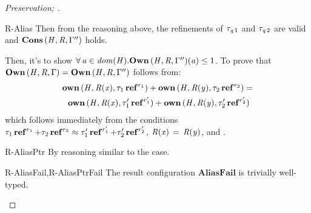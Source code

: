 \begin{proof}[Preservation; ]
\begin{rneqncase}{R-Alias}
    Then from the reasoning above, the refinements of $\tau_{\mathit{q}\,{\mathrm{1}}}$ and $\tau_{\mathit{q}\,{\mathrm{2}}}$ are valid and $\mathbf{Cons} \, (  \mathit{H}  ,  \mathit{R}  ,  \Gamma''  )$ holds.

    Then, it's to show $\forall \,  \mathit{a}  \in \mathit{dom}( \mathit{H} )   .  \mathbf{Own} \, (  \mathit{H}  ,  \mathit{R}  ,  \Gamma''  )  (  \mathit{a}  )  \le  1$.
    To prove that $\mathbf{Own} \, (  \mathit{H}  ,  \mathit{R}  ,  \Gamma  )  =  \mathbf{Own} \, (  \mathit{H}  ,  \mathit{R}  ,  \Gamma''  )$ follows from:
    \begin{align*}
      &\mathbf{own} \, (  \mathit{H}  ,  \mathit{R}  (  \mathit{x}  )  ,   \tau_{{\mathrm{1}}}  \operatorname{\mathbf{ref}}^{ r_{{\mathrm{1}}} }   )  +  \mathbf{own} \, (  \mathit{H}  ,  \mathit{R}  (  \mathit{y}  )  ,   \tau_{{\mathrm{2}}}  \operatorname{\mathbf{ref}}^{ r_{{\mathrm{2}}} }   ) =  \\
      &\,\,\,\,\mathbf{own} \, (  \mathit{H}  ,  \mathit{R}  (  \mathit{x}  )  ,   \tau'_{{\mathrm{1}}}  \operatorname{\mathbf{ref}}^{ r'_{{\mathrm{1}}} }   )  +  \mathbf{own} \, (  \mathit{H}  ,  \mathit{R}  (  \mathit{y}  )  ,   \tau'_{{\mathrm{2}}}  \operatorname{\mathbf{ref}}^{ r'_{{\mathrm{2}}} }   )
    \end{align*}
    which follows immediately from the conditions $  \tau_{{\mathrm{1}}}  \operatorname{\mathbf{ref}}^{ r_{{\mathrm{1}}} }   +  \tau_{{\mathrm{2}}}  \operatorname{\mathbf{ref}}^{ r_{{\mathrm{2}}} }   \approx    \tau'_{{\mathrm{1}}}  \operatorname{\mathbf{ref}}^{ r'_{{\mathrm{1}}} }   +  \tau'_{{\mathrm{2}}}  \operatorname{\mathbf{ref}}^{ r'_{{\mathrm{2}}} } $, $\mathit{R}  (  \mathit{x}  ) \, = \, \mathit{R}  (  \mathit{y}  )$, and .
  \end{rneqncase} %

  \begin{rncase}{R-AliasPtr}
    By reasoning similar to the  case.
  \end{rncase}
    
  
  \begin{rncase}{R-AliasFail,R-AliasPtrFail} %
    The result configuration $ \mathbf{AliasFail} $ is trivially well-typed.
  \end{rncase}
  

\end{proof}
